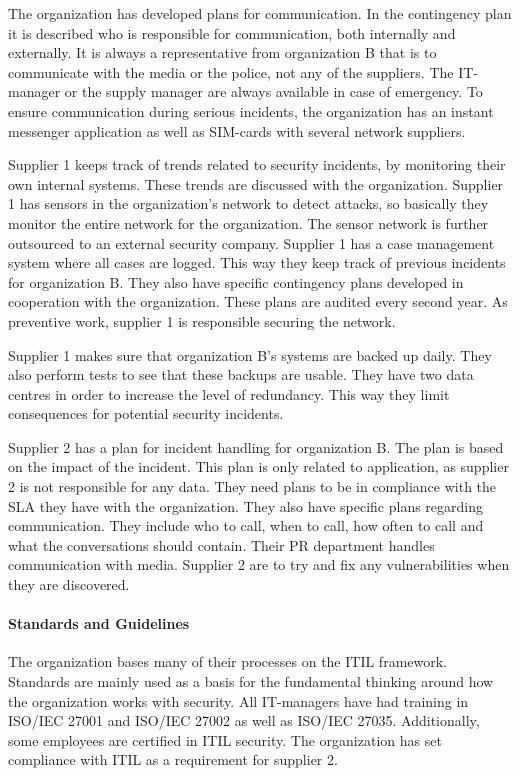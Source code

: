 The organization has developed plans for communication. In the contingency plan it is described who is responsible for communication, both internally and externally. It is always a representative from organization B that is to communicate with the media or the police, not any of the suppliers. The IT-manager or the supply manager are always available in case of emergency. To ensure communication during serious incidents, the organization has an instant messenger application as well as SIM-cards with several network suppliers. 

Supplier 1 keeps track of trends related to security incidents, by monitoring their own internal systems. These trends are discussed with the organization. Supplier 1 has sensors in the organization's network to detect attacks, so basically they monitor the entire network for the organization. The sensor network is further outsourced to an external security company. Supplier 1 has a case management system where all cases are logged. This way they keep track of previous incidents for organization B. They also have specific contingency plans developed in cooperation with the organization. These plans are audited every second year. As preventive work, supplier 1 is responsible securing the network.

Supplier 1 makes sure that organization B's systems are backed up daily. They also perform tests to see that these backups are usable. They have two data centres in order to increase the level of redundancy. This way they limit consequences for potential security incidents.

Supplier 2 has a plan for incident handling for organization B. The plan is based on the impact of the incident. This plan is only related to application, as supplier 2 is not responsible for any data. They need plans to be in compliance with the \ac{SLA} they have with the organization. They also have specific plans regarding communication. They include who to call, when to call, how often to call and what the conversations should contain. Their PR department handles communication with media. Supplier 2 are to try and fix any vulnerabilities when they are discovered.

\paragraph{Standards and Guidelines}
The organization bases many of their processes on the ITIL framework. Standards are mainly used as a basis for the fundamental thinking around how the organization works with security. All IT-managers have had training in ISO/IEC 27001 and ISO/IEC 27002 as well as ISO/IEC 27035. Additionally, some employees are certified in ITIL security. The organization has set compliance with \ac{ITIL} as a requirement for supplier 2. 

